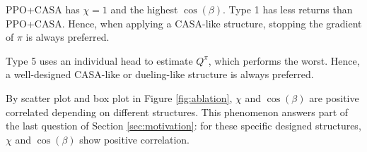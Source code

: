 { PPO+CASA has $\chi=1$ and the highest $\cos(\beta)$. }
Type 1 has less returns than PPO+CASA. 
Hence, when applying a CASA-like structure, stopping the gradient of $\pi$ is always preferred. 

{ Type 5 uses an individual head to estimate $Q^\pi$, which performs the worst. 
Hence, a well-designed CASA-like or dueling-like structure is always preferred. }

{ By scatter plot and box plot in Figure \ref{fig:ablation}, $\chi$ and $\cos(\beta)$ are positive correlated depending on different structures.
This phenomenon answers part of the last question of Section \ref{sec:motivation}: for these specific designed structures, $\chi$ and $\cos(\beta)$ show positive correlation. }



